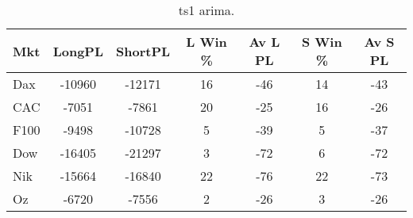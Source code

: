 \begin{table}[ht]
\centering
\caption[arima.]{ts1 arima.} 
\label{tab:chp_ts:arima1}
\begin{tabular}{lcccccc}
  \toprule Mkt & LongPL & ShortPL & L Win \% & Av L PL & S Win \% & Av S PL \\ 
  \midrule Dax & -10960 & -12171 & 16 & -46 & 14 & -43 \\ 
  CAC & -7051 & -7861 & 20 & -25 & 16 & -26 \\ 
  F100 & -9498 & -10728 & 5 & -39 & 5 & -37 \\ 
  Dow & -16405 & -21297 & 3 & -72 & 6 & -72 \\ 
  Nik & -15664 & -16840 & 22 & -76 & 22 & -73 \\ 
  Oz & -6720 & -7556 & 2 & -26 & 3 & -26 \\ 
   \bottomrule \end{tabular}
\end{table}
